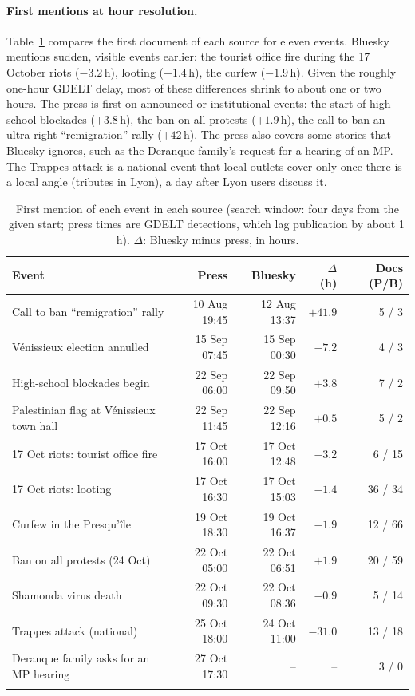 \documentclass[pdflatex,sn-mathphys-num]{sn-jnl}
\begin{document}
\paragraph{First mentions at hour resolution.} Table~\ref{tab:first} compares the first document of each source for eleven events. Bluesky mentions sudden, visible events earlier: the tourist office fire during the 17 October riots ($-3.2$\,h), looting ($-1.4$\,h), the curfew ($-1.9$\,h). Given the roughly one-hour GDELT delay, most of these differences shrink to about one or two hours. The press is first on announced or institutional events: the start of high-school blockades ($+3.8$\,h), the ban on all protests ($+1.9$\,h), the call to ban an ultra-right ``remigration'' rally ($+42$\,h). The press also covers some stories that Bluesky ignores, such as the Deranque family's request for a hearing of an MP. The Trappes attack is a national event that local outlets cover only once there is a local angle (tributes in Lyon), a day after Lyon users discuss it.

\begin{table}[htbp]
\caption{First mention of each event in each source (search window: four days from the given start; press times are GDELT detections, which lag publication by about 1\,h). $\Delta$: Bluesky minus press, in hours.}\label{tab:first}
\begin{tabular*}{\textwidth}{@{\extracolsep\fill}lrrrr}
\toprule
Event & Press & Bluesky & $\Delta$ (h) & Docs (P/B) \\
\midrule
Call to ban ``remigration'' rally & 10 Aug 19:45 & 12 Aug 13:37 & $+41.9$ & 5 / 3 \\
V\'enissieux election annulled & 15 Sep 07:45 & 15 Sep 00:30 & $-7.2$ & 4 / 3 \\
High-school blockades begin & 22 Sep 06:00 & 22 Sep 09:50 & $+3.8$ & 7 / 2 \\
Palestinian flag at V\'enissieux town hall & 22 Sep 11:45 & 22 Sep 12:16 & $+0.5$ & 5 / 2 \\
17 Oct riots: tourist office fire & 17 Oct 16:00 & 17 Oct 12:48 & $-3.2$ & 6 / 15 \\
17 Oct riots: looting & 17 Oct 16:30 & 17 Oct 15:03 & $-1.4$ & 36 / 34 \\
Curfew in the Presqu'\^ile & 19 Oct 18:30 & 19 Oct 16:37 & $-1.9$ & 12 / 66 \\
Ban on all protests (24 Oct) & 22 Oct 05:00 & 22 Oct 06:51 & $+1.9$ & 20 / 59 \\
Shamonda virus death & 22 Oct 09:30 & 22 Oct 08:36 & $-0.9$ & 5 / 14 \\
Trappes attack (national) & 25 Oct 18:00 & 24 Oct 11:00 & $-31.0$ & 13 / 18 \\
Deranque family asks for an MP hearing & 27 Oct 17:30 & -- & -- & 3 / 0 \\
\botrule
\end{tabular*}
\end{table}
\end{document}
